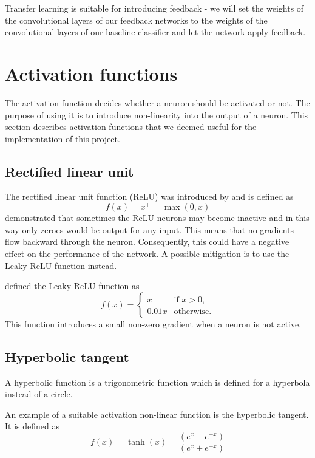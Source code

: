 \documentclass{l4proj}
\begin{document}
Transfer learning is suitable for introducing feedback - we will set the weights of the convolutional layers of our feedback networks to the weights of the convolutional layers of our baseline classifier and let the network apply feedback.

\section{Activation functions}
The activation function decides whether a neuron should be activated or not. The purpose of using it is to introduce non-linearity into the output of a neuron. This section describes activation functions that we deemed useful for the implementation of this project.

\subsection{Rectified linear unit}
The rectified linear unit function (ReLU) was introduced by \cite{relu} and is defined as
\begin{equation}
    f(x)=x^{+}=\max(0,x)
\end{equation}
\cite{dyingrelu} demonstrated that sometimes the ReLU neurons may become inactive and in this way only zeroes would be output for any input. This means that no gradients flow backward through the neuron. Consequently, this could have a negative effect on the performance of the network. A possible mitigation is to use the Leaky ReLU function instead.

\cite{leakyrelu} defined the Leaky ReLU function as
\begin{equation}
    f(x)={\begin{cases}x&{\text{if }}x>0,\\0.01x&{\text{otherwise}}.\end{cases}}
\end{equation}
This function introduces a small non-zero gradient when a neuron is not active.

\subsection{Hyperbolic tangent}
A hyperbolic function is a trigonometric function which is defined for a hyperbola instead of a circle. 

An example of a suitable activation non-linear function is the hyperbolic tangent. It is defined as
\begin{equation}
    f(x)=\tanh(x)={\frac {(e^{x}-e^{-x})}{(e^{x}+e^{-x})}}
\end{equation}
\end{document}
